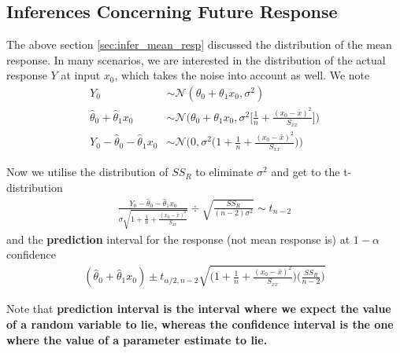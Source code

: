 \documentclass[../probability-notes.tex]{subfiles}
\begin{document}
    \subsection{Inferences Concerning Future Response}
    The above section \ref{sec:infer_mean_resp} discussed the distribution of the mean response. In many scenarios, we are interested in the distribution of the actual response $Y$ at input $x_{0}$, which takes the noise into account as well. We note
    \begin{align*}
        Y_{0} &\sim \mathcal{N}(\theta_{0} + \theta_{1}x_{0}, \sigma^{2})\\
        \hat{\theta}_{0} + \hat{\theta}_{1}x_{0} &\sim \mathcal{N}\bigg(\theta_{0} + \theta_{1}x_{0}, \sigma^{2} \bigg[ \frac{1}{n} + \frac{(x_{0} - \bar{x})^{2}}{S_{xx}} \bigg]\bigg)\\
        Y_{0} - \hat{\theta}_{0} - \hat{\theta}_{1}x_{0} &\sim \mathcal{N}\bigg(0, \sigma^{2}\bigg( 1 + \frac{1}{n} + \frac{(x_{0} - \bar{x})^{2}}{S_{xx}} \bigg)\bigg)
    \end{align*}

    Now we utilise the distribution of $SS_{R}$ to eliminate $\sigma^{2}$ and get to the t-distribution
    \begin{align*}
        \frac{Y_{0} - \hat{\theta}_{0} - \hat{\theta}_{1}x_{0}}{\sigma\sqrt{1 + \frac{1}{n} + \frac{(x_{0} - \bar{x})^{2}}{S_{xx}}}} \div \sqrt{\frac{SS_{R}}{(n-2)\sigma^{2}}} \sim t_{n-2}
    \end{align*}
    and the \textbf{prediction} interval for the response (not mean response is) at $1-\alpha$ confidence
    \begin{align*}
        (\hat{\theta}_{0} + \hat{\theta}_{1}x_{0}) \pm t_{\alpha/2, n-2} \sqrt{\bigg( 1+ \frac{1}{n} + \frac{(x_{0} - \bar{x})^{2}}{S_{xx}} \bigg) \bigg( \frac{SS_{R}}{n-2}\bigg)}
    \end{align*}

    Note that \textbf{prediction interval is the interval where we expect the value of a random variable to lie, whereas the confidence interval is the one where the value of a parameter estimate to lie.}

    
\end{document}
